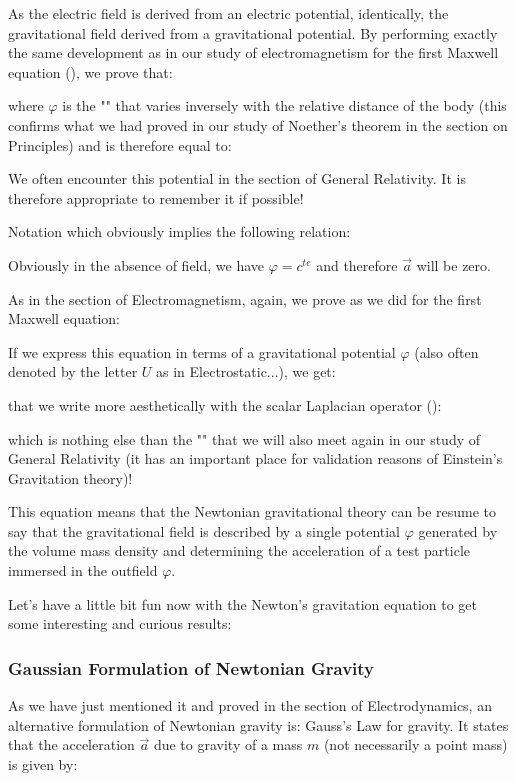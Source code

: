 	As the electric field is derived from an electric potential, identically, the gravitational field derived from a gravitational potential. By performing exactly the same development as in  our study of electromagnetism for the first Maxwell equation (), we prove that:
	
	where $\varphi$ is the "" that varies inversely with the relative distance of the body (this confirms what we had proved in our study of Noether's theorem in the section on Principles) and is therefore equal to:
	
	\begin{tcolorbox}[title=Remark,colframe=black,arc=10pt]
	We often encounter this potential in the section of General Relativity. It is therefore appropriate to remember it if possible!
	\end{tcolorbox}	
	Notation which obviously implies the following relation:
	
	\begin{tcolorbox}[title=Remark,colframe=black,arc=10pt]
	Obviously in the absence of field, we have $\varphi=c^{te}$ and therefore $\vec{a}$  will be zero.
	\end{tcolorbox}
	As in the section of Electromagnetism, again, we prove as we did for the first Maxwell equation:
	
	If we express this equation in terms of a gravitational potential $\varphi$ (also often denoted by the letter $U$ as in Electrostatic...), we get:
	
	that we write more aesthetically with the scalar Laplacian operator ():
	
	which is nothing else than the "" that we will  also meet again in our study of General Relativity (it has an important place for validation reasons of Einstein's Gravitation theory)!
	
	This equation means that the Newtonian gravitational theory can be resume to say that the gravitational field is described by a single potential $\varphi$ generated by the volume mass density and determining the acceleration of a test particle immersed in the outfield $\varphi$.
	
	Let's have a little bit fun now with the Newton's gravitation equation to get some interesting and curious results:
	
	\subsubsection{Gaussian Formulation of Newtonian Gravity}
	As we have just mentioned it and proved in the section of Electrodynamics, an alternative formulation of Newtonian gravity is: Gauss’s Law for gravity. It states that the acceleration $\vec{a}$ due to gravity of a mass $m$ (not necessarily a point mass) is given by:
	
